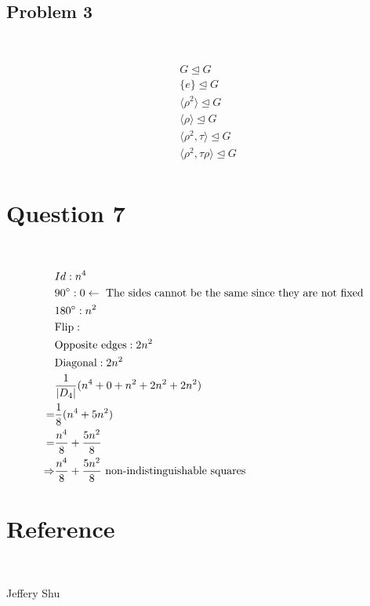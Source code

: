 \documentclass{article}
\begin{document}
~

\subsection*{Problem 3}

~

\begin{equation*}
    \begin{split}
        &G\unlhd G\\
        &\{e\}\unlhd G\\
        &\langle\rho^2\rangle\unlhd G\\
        &\langle\rho\rangle\unlhd G\\
        &\langle\rho^2,\tau\rangle\unlhd G\\
        &\langle\rho^2,\tau\rho\rangle\unlhd G\\
    \end{split}
\end{equation*}

\newpage

\section*{Question 7}

~

\begin{equation*}
    \begin{split}
        &Id:n^4\\
        &90\degree:0\leftarrow\text{ The sides cannot be the same since they are not fixed}\\
        &180\degree:n^2\\
        &\text{Flip}:\\
        &\text{Opposite edges}:2n^2\\
        &\text{Diagonal}:2n^2\\
        &\frac{1}{|D_4|}(n^4+0+n^2+2n^2+2n^2)\\
        =&\frac{1}{8}(n^4+5n^2)\\
        =&\frac{n^4}{8}+\frac{5n^2}{8}\\
        \Rightarrow&\frac{n^4}{8}+\frac{5n^2}{8}\text{ non-indistinguishable squares}\\
    \end{split}
\end{equation*}

\newpage

\section*{Reference}

~

Jeffery Shu
\end{document}
